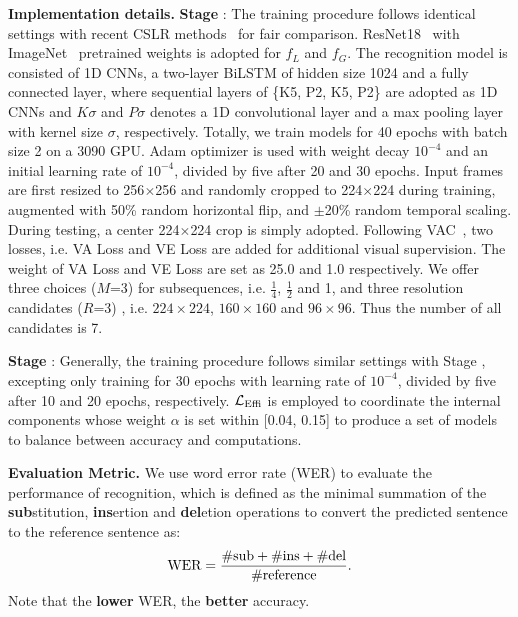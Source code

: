 \documentclass[sigconf]{acmart}
\begin{document}
\textbf{Implementation details.}
\textbf{Stage \uppercase\expandafter{}}: The training procedure follows identical settings with recent CSLR methods~\cite{Min_2021_ICCV,cheng2020fully,pu2020boosting,niu2020stochastic} for fair comparison. ResNet18~\cite{he2016deep} with ImageNet~\cite{deng2009imagenet} pretrained weights is adopted for $f_L$ and $f_G$. The recognition model is consisted of 1D CNNs, a two-layer BiLSTM of hidden size 1024 and a fully connected layer, where sequential layers of \{K5, P2, K5, P2\} are adopted as 1D CNNs and $K\sigma $ and $P\sigma$ denotes a 1D convolutional layer and a max pooling layer with kernel size $\sigma$, respectively. Totally, we train models for 40 epochs with batch size 2 on a 3090 GPU. Adam optimizer is used with weight decay $10^{-4}$ and an initial learning rate of $10^{-4}$, divided by five after 20 and 30 epochs. Input frames are first resized to 256$\times$256 and randomly cropped to 224$\times$224 during training, augmented with 50\% random horizontal flip, and $\pm$20\% random temporal scaling. During testing, a center 224$\times$224 crop is simply adopted. Following VAC~\cite{Min_2021_ICCV}, two losses, i.e. VA Loss and VE Loss are added for additional visual supervision. The weight of VA Loss and VE Loss are set as 25.0 and 1.0 respectively.  We offer three choices ($M$=3) for subsequences, i.e. $\frac{1}{4}$, $\frac{1}{2}$ and 1, and three resolution candidates ($R$=3) , i.e. $224\times 224$, $160\times 160$ and $96\times 96$. Thus the number of all candidates is 7. 

\textbf{Stage \uppercase\expandafter{}}: Generally, the training procedure follows similar settings with Stage \uppercase\expandafter{}, excepting only training for 30 epochs with learning rate of $10^{-4}$, divided by five after 10 and 20 epochs, respectively. $\mathcal{L}_{{\rm Effi}}$ is employed to coordinate the internal components whose weight $\alpha$ is set within [0.04, 0.15] to produce a set of models to balance between accuracy and computations.

\textbf{Evaluation Metric.} 
We use word error rate (WER) to evaluate the performance of recognition, which is defined as the minimal summation of the \textbf{sub}stitution, \textbf{ins}ertion and \textbf{del}etion operations to convert the predicted sentence to the reference sentence as:
  \begin{equation}
    \label{e13}
    {\rm WER = \frac{\#sub+\#ins+\#del}{\#reference}.}
  \end{equation}
Note that the \textbf{lower} WER, the \textbf{better} accuracy.
\end{document}
